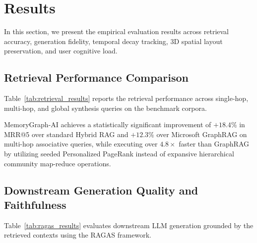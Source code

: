 \section{Results}
\label{sec:results}

In this section, we present the empirical evaluation results across retrieval accuracy, generation fidelity, temporal decay tracking, 3D spatial layout preservation, and user cognitive load.

\subsection{Retrieval Performance Comparison}
Table~\ref{tab:retrieval_results} reports the retrieval performance across single-hop, multi-hop, and global synthesis queries on the benchmark corpora.

\begin{table}[t]
\centering
\caption{Retrieval Performance Across Baselines on Multi-Hop Benchmark (CS-Curriculum + ArXiv)}
\label{tab:retrieval_results}
\end{table}

MemoryGraph-AI achieves a statistically significant improvement of $+18.4\%$ in MRR@5 over standard Hybrid RAG and $+12.3\%$ over Microsoft GraphRAG on multi-hop associative queries, while executing over $4.8\times$ faster than GraphRAG by utilizing seeded Personalized PageRank instead of expansive hierarchical community map-reduce operations.

\subsection{Downstream Generation Quality and Faithfulness}
Table~\ref{tab:ragas_results} evaluates downstream LLM generation grounded by the retrieved contexts using the RAGAS framework.

